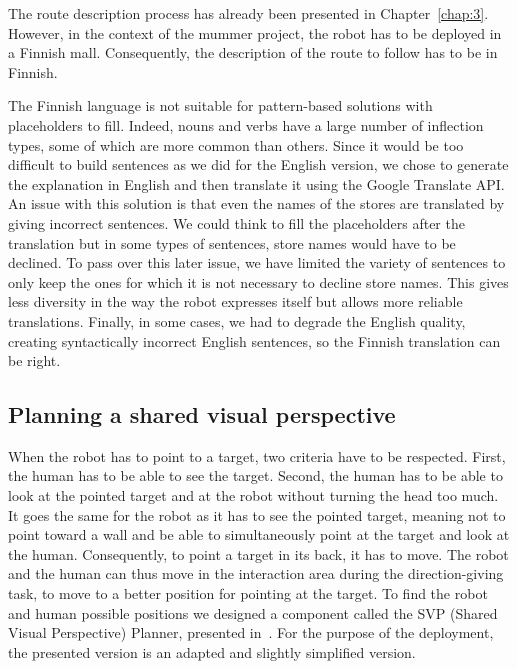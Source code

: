 The route description process has already been presented in Chapter~\ref{chap:3}. However, in the context of the \acrshort{mummer} project, the robot has to be deployed in a Finnish mall. Consequently, the description of the route to follow has to be in Finnish.

The Finnish language is not suitable for pattern-based solutions with placeholders to fill. Indeed, nouns and verbs have a large number of inflection types, some of which are more common than others. Since it would be too difficult to build sentences as we did for the English version, we chose to generate the explanation in English and then translate it using the Google Translate API. An issue with this solution is that even the names of the stores are translated by giving incorrect sentences. We could think to fill the placeholders after the translation but in some types of sentences, store names would have to be declined. To pass over this later issue, we have limited the variety of sentences to only keep the ones for which it is not necessary to decline store names. This gives less diversity in the way the robot expresses itself but allows more reliable translations. Finally, in some cases, we had to degrade the English quality, creating syntactically incorrect English sentences, so the Finnish translation can be right.

\subsection{Planning a shared visual perspective}

When the robot has to point to a target, two criteria have to be respected. First, the human has to be able to see the target. Second, the human has to be able to look at the pointed target and at the robot without turning the head too much. It goes the same for the robot as it has to see the pointed target, meaning not to point toward a wall and be able to simultaneously point at the target and look at the human. Consequently, to point a target in its back, it has to move. The robot and the human can thus move in the interaction area during the direction-giving task, to move to a better position for pointing at the target. To find the robot and human possible positions we designed a component called the SVP (Shared Visual Perspective) Planner, presented in~\cite{waldhart_2019_reasoning}. For the purpose of the deployment, the presented version is an adapted and slightly simplified version.

